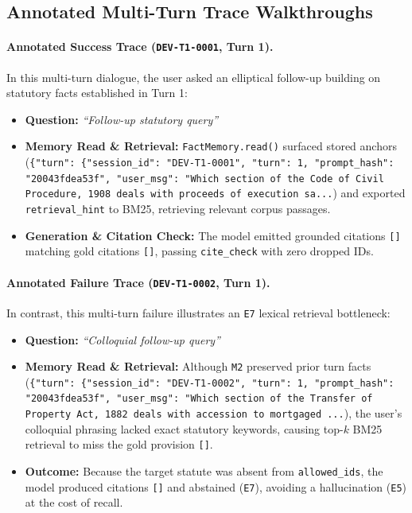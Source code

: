 \documentclass[11pt]{article}
\begin{document}
\subsection{Annotated Multi-Turn Trace Walkthroughs}
\paragraph{Annotated Success Trace (\texttt{DEV-T1-0001}, Turn 1).}
In this multi-turn dialogue, the user asked an elliptical follow-up building on statutory facts established in Turn 1:
\begin{itemize}[leftmargin=*,nosep]
    \item \textbf{Question:} \emph{``Follow-up statutory query''}
    \item \textbf{Memory Read \& Retrieval:} \texttt{FactMemory.read()} surfaced stored anchors (\texttt{\{"turn": \{"session\_id": "DEV-T1-0001", "turn": 1, "prompt\_hash": "20043fdea53f", "user\_msg": "Which section of the Code of Civil Procedure, 1908 deals with proceeds of execution sa...}) and exported \texttt{retrieval\_hint} to BM25, retrieving relevant corpus passages.
    \item \textbf{Generation \& Citation Check:} The model emitted grounded citations \texttt{[]} matching gold citations \texttt{[]}, passing \texttt{cite\_check} with zero dropped IDs.
\end{itemize}

\paragraph{Annotated Failure Trace (\texttt{DEV-T1-0002}, Turn 1).}
In contrast, this multi-turn failure illustrates an \texttt{E7} lexical retrieval bottleneck:
\begin{itemize}[leftmargin=*,nosep]
    \item \textbf{Question:} \emph{``Colloquial follow-up query''}
    \item \textbf{Memory Read \& Retrieval:} Although \texttt{M2} preserved prior turn facts (\texttt{\{"turn": \{"session\_id": "DEV-T1-0002", "turn": 1, "prompt\_hash": "20043fdea53f", "user\_msg": "Which section of the Transfer of Property Act, 1882 deals with accession to mortgaged ...}), the user's colloquial phrasing lacked exact statutory keywords, causing top-$k$ BM25 retrieval to miss the gold provision \texttt{[]}.
    \item \textbf{Outcome:} Because the target statute was absent from \texttt{allowed\_ids}, the model produced citations \texttt{[]} and abstained (\texttt{E7}), avoiding a hallucination (\texttt{E5}) at the cost of recall.
\end{itemize}
\end{document}
